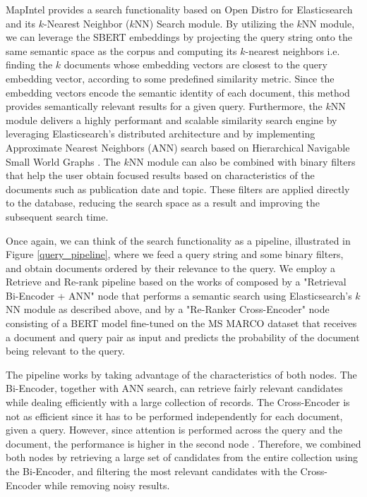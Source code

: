\documentclass[a4paper]{article}
\begin{document}
MapIntel provides a search functionality based on Open Distro for Elasticsearch and its $k$-Nearest Neighbor ($k$NN) Search module. By utilizing the $k$NN module, we can leverage the SBERT embeddings by projecting the query string onto the same semantic space as the corpus and computing its $k$-nearest neighbors i.e. finding the $k$ documents whose embedding vectors are closest to the query embedding vector, according to some predefined similarity metric. Since the embedding vectors encode the semantic identity of each document, this method provides semantically relevant results for a given query. Furthermore, the $k$NN module delivers a highly performant and scalable similarity search engine by leveraging Elasticsearch’s distributed architecture and by implementing Approximate Nearest Neighbors (ANN) search based on Hierarchical Navigable Small World Graphs \citep{malkov2018}. The $k$NN module can also be combined with binary filters that help the user obtain focused results based on characteristics of the documents such as publication date and topic. These filters are applied directly to the database, reducing the search space as a result and improving the subsequent search time.

Once again, we can think of the search functionality as a pipeline, illustrated in Figure \ref{query_pipeline}, where we feed a query string and some binary filters, and obtain documents ordered by their relevance to the query. We employ a Retrieve and Re-rank pipeline based on the works of \citet{nogueira2020a, kratzwald2019} composed by a "Retrieval Bi-Encoder + ANN" node that performs a semantic search using Elasticsearch’s $k$NN module as described above, and by a "Re-Ranker Cross-Encoder" node consisting of a BERT model fine-tuned on the MS MARCO dataset that receives a document and query pair as input and predicts the probability of the document being relevant to the query. 

The pipeline works by taking advantage of the characteristics of both nodes. The Bi-Encoder, together with ANN search, can retrieve fairly relevant candidates while dealing efficiently with a large collection of records. The Cross-Encoder is not as efficient since it has to be performed independently for each document, given a query. However, since attention is performed across the query and the document, the performance is higher in the second node \citep{humeau2019}. Therefore, we combined both nodes by retrieving a large set of candidates from the entire collection using the Bi-Encoder, and filtering the most relevant candidates with the Cross-Encoder while removing noisy results.
\end{document}
